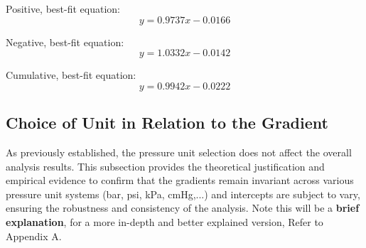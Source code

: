 \documentclass{article}
\begin{document}
\begin{center}
	\hspace*{-2em}
	\begin{minipage}{1.1\textwidth}
		\begin{minipage}{0.3\textwidth}	\centering
			Positive, best-fit equation: 
			\[y = 0.9737x-0.0166\]
		\end{minipage}\hfill
		\begin{minipage}{0.3\textwidth}	\centering
			Negative, best-fit equation: 
			\[y = 1.0332x-0.0142\]
		\end{minipage}\hfill
		\begin{minipage}{0.3\textwidth}	\centering
			Cumulative, best-fit equation: 
			\[y = 0.9942x-0.0222\]
		\end{minipage}
	\end{minipage}
\end{center}
	
\subsection{Choice of Unit in Relation to the Gradient}\label{consistency}
As previously established, the pressure unit selection does not affect the overall analysis results. This subsection provides the theoretical justification and empirical evidence to confirm that the gradients remain invariant across various pressure unit systems (bar, psi, kPa, cmHg,...) and intercepts are subject to vary, ensuring the robustness and consistency of the analysis. Note this will be a \textbf{brief explanation}, for a more in-depth and better explained version, Refer to Appendix A.\vspace{-1em}
\end{document}
